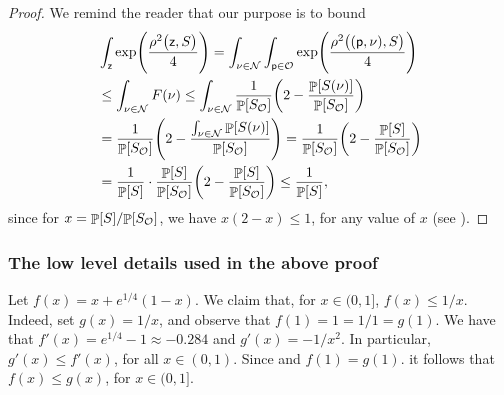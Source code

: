 \begin{proof}
    We remind the reader that our purpose is to bound
    \begin{align*}
        &\int_\pntE  \exp \pth{\frac{\distTSqY{\bigl.\pntE}{\SetA}
           }{4}}
        =%
        \int_{\nu \in \NewOm}
        \int_{\pnt \in \OldOm}
        \exp \pth{\frac{\distTSqY{\bigl.(\pnt, \nu)}{\SetA}
           }{4}}%
        \\&
        \leq%
        \int_{\nu \in \NewOm} F(\nu) %
        \leq%
        \int_{\nu \in \NewOm} 
        \frac{1}{\Prob{ \SetA_\OldOm}}
        \pth{2-  \frac{\Prob{ \SetA(\nu) }} {\Prob{
                 \SetA_\OldOm}}}\\
        &=         
        \frac{1}{\Prob{ \SetA_\OldOm}}
        \pth{2-  \frac{ \int_{\nu \in \NewOm}  \Prob{\SetA(\nu) }} {\Prob{
                 \SetA_\OldOm}}}%
        =%
        \frac{1}{\Prob{ \SetA_\OldOm}}
        \pth{2-  \frac{  \Prob{\SetA }} {\Prob{
                 \SetA_\OldOm}}}
        \\&
        =%
        \frac{1}{\Prob{\SetA }}%
        \cdot
        \frac{\Prob{\SetA }}{\Prob{ \SetA_\OldOm}}
        \pth{2-  \frac{  \Prob{\SetA }} {\Prob{
                 \SetA_\OldOm}}}%
        \leq %
        \frac{1}{\Prob{\SetA }},
    \end{align*}    
    since for $x = {\Prob{\SetA }}/{\Prob{ \SetA_\OldOm}}$, we have
    $x(2-x) \leq 1$, for any value of $x$ (see ).
\end{proof}


\subsubsection{The low level details used in the above proof}

\begin{tedium}
    Let $f(x) = x + e^{1/4}(1-x)$.  We claim that, for $x \in (0,1]$,
    $f(x) \leq 1/x$.  Indeed, set $g(x) = 1/x$, and observe that
    $f(1) = 1 = 1/1 = g(1)$.  We have that
    $f'(x) = e^{1/4}-1 \approx -0.284$ and $g'(x) = -1/x^2$. In
    particular, $g'(x) \leq f'(x)$, for all $x \in (0,1)$. Since and
    $f(1) = g(1)$. it follows that $f(x) \leq g(x)$, for
    $x \in (0,1]$.
\end{tedium}

